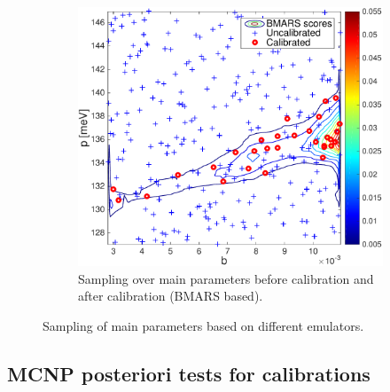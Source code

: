 \documentclass[review]{elsarticle}
\begin{document}
\begin{figure}[ht!]
\begin{subfigure}{0.5\textwidth}
\includegraphics[width=1.45\linewidth]{NSE15-48R1_Figure14b.pdf}
\caption{Sampling over main parameters before calibration and after calibration (BMARS based).}
\label{fg:bmsam}
\end{subfigure}
\caption{Sampling of main parameters based on different emulators.}
\label{fg:testssam}
\end{figure}

\subsection{MCNP posteriori tests for calibrations}
\end{document}
